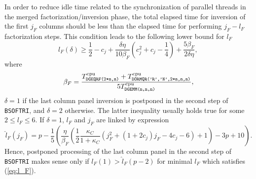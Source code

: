 \documentclass{llncs}
\newcommand{\Bsoftri}{\texttt{BSOFTRI}\xspace}
\begin{document}
    In order to reduce idle time 
    related to 
    the synchronization of parallel threads 
    in the merged factorization/inversion phase, 
    the total elapsed time for inversion of the first $j_F$ columns
    should be less than 
    the elapsed time for performing $j_F-l_F$ factorization steps.
    This condition leads to the following lower bound for $l_F$
    \begin{equation}
      \label{eq:l_F}
      l_{F}(\delta) \ge
      \frac{1}{2} - c_{j} + \frac{\delta \eta}{10 \beta_F } 
      \left( c_{j}^{2} + c_{j}  - \frac{1}{4} \right) + \frac{5 \beta_F }{2 \delta \eta}
      , \,
    \end{equation}
    where 
    \begin{equation*}
      \beta_F  = \frac{T^{\rm cpu}_{\texttt{DGEQRF(2*n,n)}} + T^{\rm cpu}_{\texttt{DORMQR('R','N',2*n,n,n)}}}{5 T^{\rm cpu}_{\texttt{DGEMM(n,n,n)}}},
    \end{equation*}
    $\delta=1$ if the last column panel inversion 
    is postponed in the second step of \Bsoftri,
    and $\delta=2$ otherwise. 
    The latter inequality usually holds true for some $2 \le l_F \le 6$.
    If $\delta=1$, $l_F$ and $j_F$ are linked by expression
    \begin{equation*}
      \label{eq:l_F2}
      \hat{l}_F(j_F) = p - {\frac{1}{5}\left(\frac{\eta}{\beta_{F} } 
        \left( \frac{1}{2}\frac{\kappa_{C}}{1+\kappa_{C}} 
        \left(j_F^2 + (1+2c_j)j_F  - 4 c_j - 6 \right) 
        + 1 \right) - 3 p +  10\right) }
      .
    \end{equation*}
    Hence, postponed processing of the last column panel in the second step of \Bsoftri 
    makes sense only if $l_F(1) > \hat{l}_F(p-2)$
    for minimal $l_F$ which satisfies (\ref{eq:l_F}).
\end{document}
